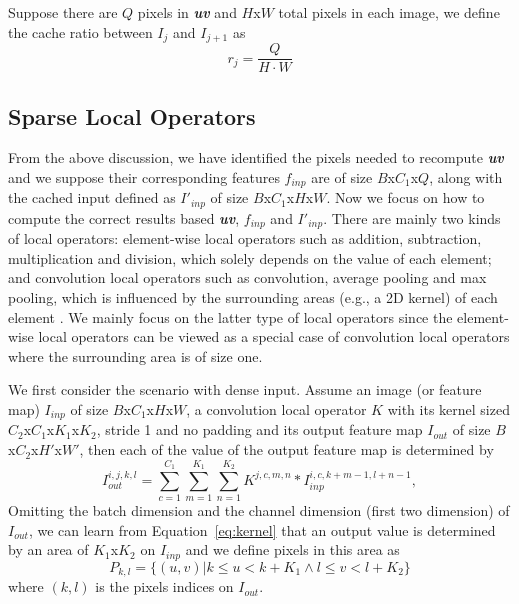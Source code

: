 Suppose there are $Q$ pixels in \textit{\textbf{uv}} and $H$x$W$ total pixels in each image,
we define the cache ratio between $I_j$ and $I_{j+1}$ as 
\begin{equation}
    r_j = \frac{Q}{H\cdot W}
\end{equation}

\subsection{Sparse Local Operators}
From the above discussion, we have identified the pixels needed to recompute \textit{\textbf{uv}} and we suppose their corresponding features $f_{inp}$ are of size $B$x$C_1$x$Q$, along with the cached input defined as $I'_{inp}$ of size $B$x$C_1$x$H$x$W$.
Now we focus on how to compute the correct results based \textit{\textbf{uv}}, $f_{inp}$ and $I'_{inp}$.
There are mainly two kinds of local operators: element-wise local operators such as addition, subtraction, multiplication and division, which solely depends on the value of each element; and convolution local operators such as convolution, average pooling and max pooling, which is influenced by the surrounding areas (e.g., a 2D kernel) of each element .
We mainly focus on the latter type of local operators since the element-wise local operators can be viewed as a special case of convolution local operators where the surrounding area is of size one.

We first consider the scenario with dense input.
Assume an image (or feature map) $I_{inp}$ of size $B$x$C_1$x$H$x$W$, a convolution local operator $K$ with its kernel sized $C_2$x$C_1$x$K_1$x$K_2$, stride 1 and no padding and its output feature map $I_{out}$ of size $B$x$C_2$x$H'$x$W'$, then each of the value of the output feature map is determined by
\begin{equation}
    I_{out}^{i,j,k,l} = \sum_{c=1}^{C_1} \sum_{m=1}^{K_1} \sum_{n=1}^{K_2} K^{j,c,m,n} * I_{inp}^{i,c,k+m-1,l+n-1}, 
    \label{eq:kernel}
\end{equation}
Omitting the batch dimension and the channel dimension (first two dimension) of $I_{out}$, we can learn from Equation~\ref{eq:kernel} that an output value is determined by an area of $K_1$x$K_2$ on $I_{inp}$ and we define pixels in this area as
\begin{equation}
    P_{k,l} = \{(u,v)|k\leq u < k+K_1 \land l\leq v < l+K_2\}
    \label{eq:set}
\end{equation}
where $(k,l)$ is the pixels indices on $I_{out}$.

